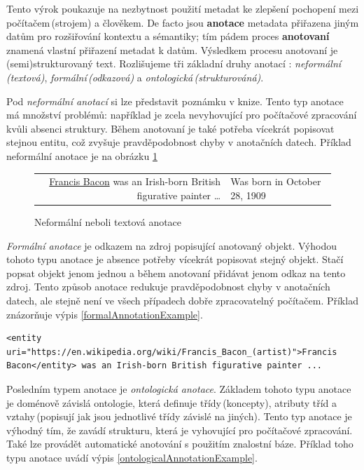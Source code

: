 Tento výrok poukazuje na nezbytnost použití metadat ke zlepšení pochopení mezi počítačem\,(strojem) a člověkem. De facto jsou \textbf{anotace}  metadata přiřazena jiným datům pro rozšiřování kontextu a sémantiky; tím pádem proces \textbf{anotovaní} znamená vlastní přiřazení metadat k datům. Výsledkem procesu anotovaní je (semi)strukturovaný text. Rozlišujeme tři základní druhy anotací \cite{bechhofer2002semantics} \cite{oren2006semantic}: \emph{neformální\,(textová)}, \emph{formální\,(odkazová)} a \emph{ontologická\,(strukturováná)}.

Pod \emph{neformální anotací} si lze představit poznámku v knize. Tento typ anotace má množství problémů: například je zcela nevyhovující pro počítačové zpracování kvůli absenci struktury. Během anotovaní je také  potřeba vícekrát popisovat stejnou entitu, což zvyšuje pravděpodobnost chyby v anotačních datech. Příklad neformální anotace je na obrázku \ref{informalAnnotationExample}

\begin{center}
\begin{figure}[ht]
	\begin{tabular}{ r | m{3cm} }
 		\underline{Francis Bacon} was an Irish-born British figurative painter \ldots & \small{Was born in October 28, 1909} \\
	\end{tabular}
    \caption{Neformální neboli textová anotace}
    \label{informalAnnotationExample}
\end{figure}
\end{center}

\emph{Formální anotace} je odkazem na zdroj popisující anotovaný objekt. Výhodou tohoto typu anotace je absence potřeby vícekrát popisovat stejný objekt. Stačí popsat objekt jenom jednou a během anotovaní přidávat jenom odkaz na tento zdroj. Tento způsob anotace redukuje pravděpodobnost chyby v anotačních datech, ale stejně není ve všech případech dobře zpracovatelný počítačem. Příklad znázorňuje výpis \ref{formalAnnotationExample}.



\begin{lstlisting}[label=formalAnnotationExample, caption={Formální neboli odkazová anotace}, captionpos=b]
<entity uri="https://en.wikipedia.org/wiki/Francis_Bacon_(artist)">Francis 
Bacon</entity> was an Irish-born British figurative painter ...
\end{lstlisting}



Posledním typem anotace je \emph{ontologická anotace}. Základem tohoto typu anotace je doménově závislá ontologie, která definuje třídy\,(koncepty), atributy tříd a vztahy\,(popisují jak jsou jednotlivé třídy závislé na jiných). Tento typ anotace je výhodný tím, že zavádí strukturu, která je vyhovující pro počítačové zpracování. Také lze provádět automatické anotování s použitím znalostní báze. Příklad toho typu anotace uvádí výpis \ref{ontologicalAnnotationExample}.


